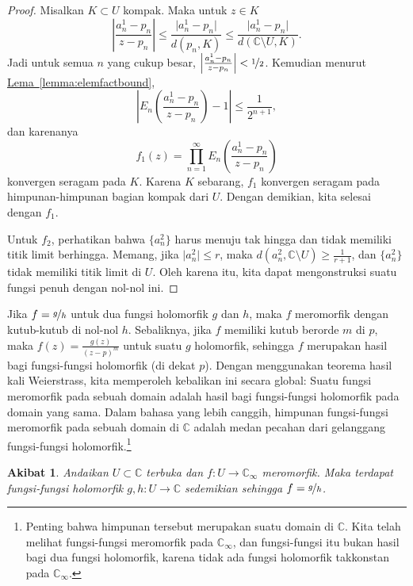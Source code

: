 \documentclass[12pt,openany]{book}
\newcommand{\sabs}[1]{\lvert {#1} \rvert}
\newcommand{\abs}[1]{\left\lvert {#1} \right\rvert}
\newcommand{\C}{{\mathbb{C}}}
\theoremstyle{plain}
\newtheorem{cor}[thm]{Akibat}
\theoremstyle{remark}
\theoremstyle{definition}
\theoremstyle{exercise}
\theoremstyle{example}
\newcommand{\lemmaref}[1]{\hyperref[#1]{Lema~\ref*{#1}}}
\begin{document}
\begin{proof}
Misalkan $K \subset U$ kompak.  Maka untuk $z \in K$
\begin{equation*}
\abs{\frac{a^1_n-p_n}{z-p_n}}
\leq
\frac{\sabs{a^1_n-p_n}}{d(p_n,K)}
\leq
\frac{\sabs{a^1_n-p_n}}{d(\C \setminus U,K)} .
\end{equation*}
Jadi untuk semua $n$ yang cukup besar,
$\abs{\frac{a^1_n-p_n}{z-p_n}} < \nicefrac{1}{2}$.
Kemudian menurut \lemmaref{lemma:elemfactbound},
\begin{equation*}
\abs{E_n\left(
\frac{a^1_n-p_n}{z-p_n}
\right)-1} \leq \frac{1}{2^{n+1}} ,
\end{equation*}
dan karenanya
\begin{equation*}
f_1(z)
=
\prod_{n=1}^\infty
E_n\left(
\frac{a^1_n-p_n}{z-p_n}
\right)
\end{equation*}
konvergen seragam pada $K$.  Karena $K$ sebarang, $f_1$ konvergen
seragam pada himpunan-himpunan bagian kompak dari $U$.  Dengan demikian, kita selesai dengan $f_1$.

Untuk $f_2$, perhatikan bahwa $\{a^2_n\}$ harus menuju tak hingga dan tidak memiliki titik limit
berhingga.  Memang, jika $\sabs{a^2_n} \leq r$, maka $d(a^2_n,\C\setminus U)
\geq \frac{1}{r+1}$, dan $\{ a^2_n \}$ tidak memiliki titik limit di
$U$.
Oleh karena itu, kita dapat mengonstruksi suatu fungsi penuh dengan
nol-nol ini.
\end{proof}

Jika $f = \nicefrac{g}{h}$ untuk dua fungsi holomorfik $g$ dan $h$, maka $f$
meromorfik dengan kutub-kutub di nol-nol $h$.  Sebaliknya,
jika $f$ memiliki kutub berorde $m$ di $p$, maka $f(z) = \frac{g(z)}{{(z-p)}^m}$
untuk suatu $g$ holomorfik, sehingga $f$ merupakan hasil bagi fungsi-fungsi holomorfik
(di dekat $p$).
Dengan menggunakan teorema hasil kali Weierstrass, kita memperoleh kebalikan ini secara global:
Suatu fungsi meromorfik pada sebuah domain adalah hasil bagi fungsi-fungsi holomorfik pada
domain yang sama.
Dalam bahasa yang lebih canggih, himpunan fungsi-fungsi meromorfik pada sebuah
domain di $\C$ adalah medan pecahan dari gelanggang fungsi-fungsi
holomorfik.\footnote{Penting bahwa himpunan tersebut merupakan suatu
domain di $\C$.  Kita telah melihat fungsi-fungsi meromorfik pada $\C_\infty$,
dan fungsi-fungsi itu bukan hasil bagi dua fungsi holomorfik, karena tidak ada
fungsi holomorfik takkonstan pada $\C_\infty$.}

\begin{cor}
Andaikan $U \subset \C$ terbuka dan $f \colon U \to \C_{\infty}$
meromorfik.  Maka terdapat fungsi-fungsi holomorfik $g,h \colon U \to \C$ sedemikian sehingga
$f = \nicefrac{g}{h}$.
\end{cor}
\end{document}
